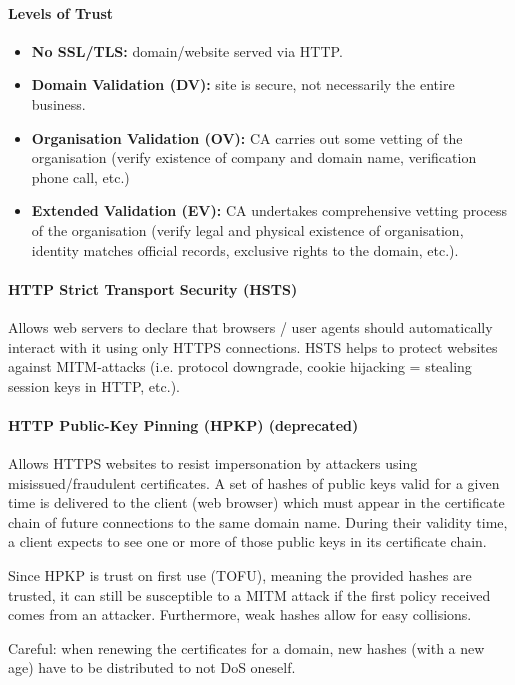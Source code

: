 \paragraph{Levels of Trust}
\begin{itemize}
    \item \textbf{No SSL/TLS:} domain/website served via HTTP.
    \item \textbf{Domain Validation (DV):} site is secure, not necessarily the entire business.
    \item \textbf{Organisation Validation (OV):} CA carries out some vetting of the organisation (verify existence of company and domain name, verification phone call, etc.)
    \item \textbf{Extended Validation (EV):} CA undertakes comprehensive vetting process of the organisation (verify legal and physical existence of organisation, identity matches official records, exclusive rights to the domain, etc.).
\end{itemize}

\paragraph{HTTP Strict Transport Security (HSTS)}
Allows web servers to declare that browsers / user agents should automatically interact with it using only HTTPS connections. HSTS helps to protect websites against MITM-attacks (i.e. protocol downgrade, cookie hijacking = stealing session keys in HTTP, etc.).

\paragraph{HTTP Public-Key Pinning (HPKP) (deprecated)}
Allows HTTPS websites to resist impersonation by attackers using misissued/fraudulent certificates. A set of hashes of public keys valid for a given time is delivered to the client (web browser) which must appear in the certificate chain of future connections to the same domain name. During their validity time, a client expects to see one or more of those public keys in its certificate chain.

Since HPKP is trust on first use (TOFU), meaning the provided hashes are trusted, it can still be susceptible to a MITM attack if the first policy received comes from an attacker. Furthermore, weak hashes allow for easy collisions.

Careful: when renewing the certificates for a domain, new hashes (with a new age) have to be distributed to not DoS oneself.

